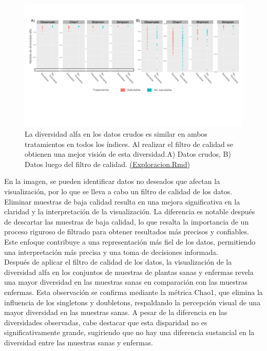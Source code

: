 \begin{figure}[h]
\centering
\includegraphics[width=\textwidth]{Img/cap2/AlphaDiversity_CrudosFiltrados.png}
\caption{La diversidad alfa en los datos crudos es similar en ambos tratamientos en todos los índices. Al realizar el filtro de calidad se obtienen una mejor visión de esta diversidad.A) Datos crudos, B) Datos luego del filtro de calidad. \href{https://github.com/CamilaSilva1995/Tesis_Maestria/blob/main/Analisis_Comparativo/Fresa_Solena/01_Exploracion.Rmd}{(Exploracion.Rmd)} }
\end{figure}

En la imagen, se pueden identificar datos no deseados que afectan la visualización, por lo que se lleva a cabo un filtro de calidad de los datos.\\

Eliminar muestras de baja calidad resulta en una mejora significativa en la claridad y la interpretación de la visualización. La diferencia es notable después de descartar las muestras de baja calidad, lo que resalta la importancia de un proceso riguroso de filtrado para obtener resultados más precisos y confiables. Este enfoque contribuye a una representación más fiel de los datos, permitiendo una interpretación más precisa y una toma de decisiones informada.\\

Después de aplicar el filtro de calidad de los datos, la visualización de la diversidad alfa en los conjuntos de muestras de plantas sanas y enfermas revela una mayor diversidad en las muestras sanas en comparación con las muestras enfermas. Esta observación se confirma mediante la métrica Chao1, que elimina la influencia de los singletons y doubletons, respaldando la percepción visual de una mayor diversidad en las muestras sanas. A pesar de la diferencia en las diversidades observadas, cabe destacar que esta disparidad no es significativamente grande, sugiriendo que no hay una diferencia sustancial en la diversidad entre las muestras sanas y enfermas.\\

